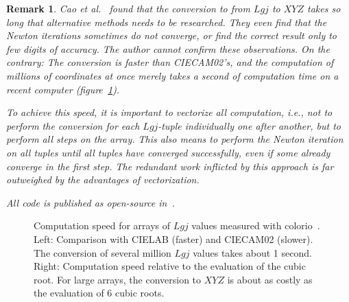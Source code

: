 \documentclass{scrartcl}
\newtheorem*{remark}{Remark}
\theoremstyle{named}
\begin{document}
\begin{remark}
  Cao et al.~\cite{cao} found that the conversion to from $Lgj$ to $XYZ$ takes so long
  that alternative methods needs to be researched. They even find that the Newton
  iterations sometimes do not converge, or find the correct result only to few digits of
  accuracy.  The author cannot confirm these observations. On the contrary: The
  conversion is faster than CIECAM02's, and the computation of millions of coordinates
  at once merely takes a second of computation time on a recent computer
  (figure~\ref{fig:speed}).

  To achieve this speed, it is important to vectorize all computation, i.e., not to
  perform the conversion for each $Lgj$-tuple individually one after another, but to
  perform all steps on the array. This also means to perform the Newton iteration on all
  tuples until all tuples have converged successfully, even if some already
  converge in the first step. The redundant work inflicted by this approach is far
  outweighed by the advantages of vectorization.

  All code is published as open-source in~\cite{colorio}.
\end{remark}

\begin{figure}
  \centering
  \hfill
  
  \hfill
  
  \hfill
  \caption{Computation speed for arrays of $Lgj$ values measured with
  colorio~\cite{colorio}. Left: Comparison with CIELAB (faster) and CIECAM02 (slower).
  The conversion of several million $Lgj$ values takes about 1 second. Right:
  Computation speed relative to the evaluation of the cubic root. For large arrays, the
  conversion to $XYZ$ is about as costly as the evaluation of 6 cubic roots.}\label{fig:speed}
\end{figure}

{}

\end{document}
